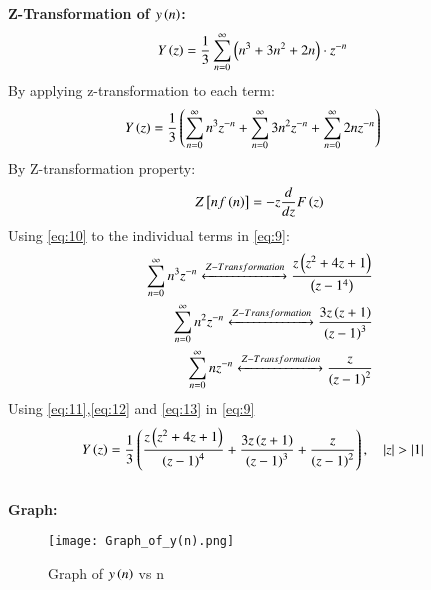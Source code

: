 \documentclass[journal,12pt,twocolumn]{IEEEtran}
\theoremstyle{remark}
\begin{document}
\textbf{Z-Transformation of $y\left(n\right)$:}\\
\begin{align}
Y\left(z\right)&=\frac{1}{3} \sum_{n=0}^{\infty} \left(n^3 + 3n^2 + 2n\right)\cdot z^{-n}\label{eq:8}
\end{align}
By applying z-transformation to each term:
\begin{align}
    Y\left(z\right)&=\frac{1}{3}\left(\sum_{n=0}^{\infty}n^3 z^{-n}+\sum_{n=0}^{\infty}3n^2z^{-n}+\sum_{n=0}^{\infty}2nz^{-n}\right) \label{eq:9}
\end{align}
By Z-transformation property:
\begin{align}
Z{}\left[nf\left(n\right)\right]=-z\frac{d}{dz}F\left(z\right)\label{eq:10}
\end{align}
Using \eqref{eq:10} to the individual terms in \eqref{eq:9}:
\begin{align}
\sum_{n=0}^{\infty}n^3 z^{-n}\xleftrightarrow[]{Z-Transformation}\frac{z\left(z^2+4z+1\right)}{\left(z-1^4\right)}\label{eq:11}\\
\sum_{n=0}^{\infty}n^2z^{-n}\xleftrightarrow[]{Z-Transformation}\frac{3z\left(z+1\right)}{\left(z-1\right)^3}\label{eq:12}\\
\sum_{n=0}^{\infty}nz^{-n}\xleftrightarrow[]{Z-Transformation} \frac{z}{\left(z-1\right)^2}\label{eq:13}
\end{align}
Using \eqref{eq:11},\eqref{eq:12} and \eqref{eq:13} in \eqref{eq:9}
\begin{align}
    Y\left(z\right)&=\frac{1}{3} \left(\frac{z\left(z^2+4z+1\right)}{\left(z-1\right)^4} + \frac{3z\left(z+1\right)}{\left(z-1\right)^3} + \frac{z}{\left(z-1\right)^2}\right),\quad\left\vert z\right\vert>\left\vert1\right\vert\label{eq:14}
\end{align}\\
\textbf{Graph:}
\begin{figure}[h]
        \centering
\texttt{[image: Graph\_of\_y(n).png]}
\caption{Graph of $y\left(n\right)$ vs n}
\label{fig:enter-label}
\end{figure}
\end{document}
